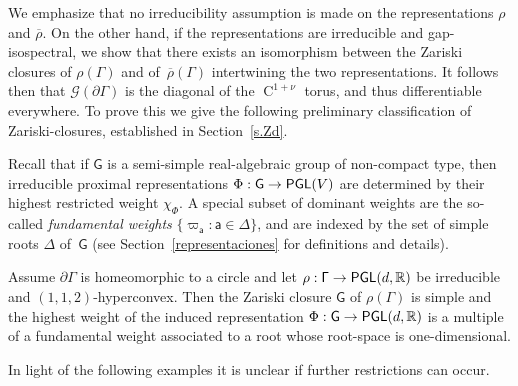 \documentclass[AHL,Unicode,longabstracts,MathTools]{cedram}
\makeatletter
\DeclareMathOperator{\class}{C}
\DeclareMathOperator{\Hff}{dim_{Hf{}f}}
\newcommand{\Ndiff}{{\mathsf{NDiff}}}
\DeclareMathOperator{\SL}{{\mathsf{SL}}}
\DeclareMathOperator{\PGL}{{\mathsf{PGL}}}
\newcommand{\scr}{\mathscr}
\newcommand{\hC}[1]{{\scr h}^{#1}}
\renewcommand{\varXi}{\mathscr{G}}
\renewcommand{\sf}[1]{{\mathsf{#1}}}
\newcommand{\sroot}{{\sf{a}}}
\newcommand{\sfG}{\sf{G}}
\newcommand{\G}{\sf{\Gamma}}
\newcommand{\R}{\mathbb{R}}
\newcommand{\bord}{\partial}
\newcommand{\simple}{{\sf \Delta}}
\newcommand{\Fund}{\Phi}
\newcommand{\peso}{\varpi}
\newcommand{\ovrho}{\overline{\!\rho}}
\newcommand{\ovd}{\bar{d}}
\renewcommand{\/}{\backslash}
\newcommand{\<}{\langle}
\renewcommand{\>}{\rangle}
\let\save@mathaccent\mathaccent
\newcommand*\if@single[3]{%
  \setbox0\hbox{${\mathaccent"0362{#1}}^H$}%
  \setbox2\hbox{${\mathaccent"0362{\kern0pt#1}}^H$}%
  \ifdim\ht0=\ht2 #3\else #2\fi
  }
\newcommand*\rel@kern[1]{\kern#1\dimexpr\macc@kerna}
\newcommand*\widebar[1]{\@ifnextchar^{{\wide@bar{#1}{0}}}{\wide@bar{#1}{1}}}
\newcommand*\wide@bar[2]{\if@single{#1}{\wide@bar@{#1}{#2}{1}}{\wide@bar@{#1}{#2}{2}}}
\newcommand*\wide@bar@[3]{%
  \begingroup
  \def\mathaccent##1##2{%
    \let\mathaccent\save@mathaccent
    \if#32 \let\macc@nucleus\first@char \fi
    \setbox\z@\hbox{$\macc@style{\macc@nucleus}_{}$}%
    \setbox\tw@\hbox{$\macc@style{\macc@nucleus}{}_{}$}%
    \dimen@\wd\tw@
    \advance\dimen@-\wd\z@
    \divide\dimen@ 3
    \@tempdima\wd\tw@
    \advance\@tempdima-\scriptspace
    \divide\@tempdima 10
    \advance\dimen@-\@tempdima
    \ifdim\dimen@>\z@ \dimen@0pt\fi
    \rel@kern{0.6}\kern-\dimen@
    \if#31
      \overline{\rel@kern{-0.6}\kern\dimen@\macc@nucleus\rel@kern{0.4}\kern\dimen@}%
      \advance\dimen@0.4\dimexpr\macc@kerna
      \let\final@kern#2%
      \ifdim\dimen@<\z@ \let\final@kern1\fi
      \if\final@kern1 \kern-\dimen@\fi
    \else
      \overline{\rel@kern{-0.6}\kern\dimen@#1}%
    \fi
  }%
  \macc@depth\@ne
  \let\math@bgroup\@empty \let\math@egroup\macc@set@skewchar
  \mathsurround\z@ \frozen@everymath{\mathgroup\macc@group\relax}%
  \macc@set@skewchar\relax
  \let\mathaccentV\macc@nested@a
  \if#31
    \macc@nested@a\relax111{#1}%
  \else
    \def\gobble@till@marker##1\endmarker{}%
    \futurelet\first@char\gobble@till@marker#1\endmarker
    \ifcat\noexpand\first@char A\else
      \def\first@char{}%
    \fi
    \macc@nested@a\relax111{\first@char}%
  \fi
  \endgroup
}
\let\oldbar\bar
\renewcommand*{\bar}[1]{{\mathchoice{\widebar{#1}}{\widebar{#1}}{\widebar{#1}}{\oldbar{#1}}}}
\renewcommand*{\to}{\mathchoice{\longrightarrow}{\rightarrow}{\rightarrow}{\rightarrow}}
\makeatother
\begin{document}

We emphasize that no irreducibility assumption is made on the representations $\rho$ and $\ovrho$. On the other hand, if the representations are irreducible and gap-isospectral, we show that there exists an isomorphism between the Zariski closures of $\rho(\G)$ and of~$\ovrho(\G)$ intertwining the two representations. It follows then that $\varXi(\bord\G)$ is the diagonal of the $\class^{1+\nu}$ torus, and thus differentiable everywhere. To prove this we give the following preliminary classification of Zariski-closures, established in Section~\ref{s.Zd}.

Recall that if $\sfG$ is a semi-simple real-algebraic group of non-compact type, then irreducible proximal representations $\Fund:\sfG\to\PGL(V)$ are determined by their highest restricted weight $\chi_\Fund$. A special subset of dominant weights are the so-called \emph{fundamental weights} $\{\peso_\sroot:\sroot\in\simple\}$, and are indexed by the set of simple roots $\simple$ of~$\sfG$ (see Section~\ref{representaciones} for definitions and details).

\begin{theo}\label{t.Zcl}
Assume $\bord\G$ is homeomorphic to a circle and let $\rho:\G\to\PGL(d,\R)$ be irreducible and $(1,1,2)$-hyperconvex. Then the Zariski closure $\sfG$ of $\rho(\G)$ is simple and the highest weight of the induced representation $\Fund:\sfG\to\PGL(d,\R)$ is a multiple of a fundamental weight associated to a root whose root-space is one-dimensional.
\end{theo}


In light of the following examples it is unclear if further restrictions can occur.
\end{document}
